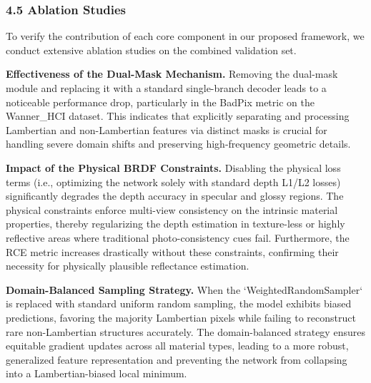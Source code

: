 \subsubsection{4.5 Ablation Studies}

To verify the contribution of each core component in our proposed framework, we conduct extensive ablation studies on the combined validation set. 

\textbf{Effectiveness of the Dual-Mask Mechanism.} 
Removing the dual-mask module and replacing it with a standard single-branch decoder leads to a noticeable performance drop, particularly in the BadPix metric on the Wanner_HCI dataset. This indicates that explicitly separating and processing Lambertian and non-Lambertian features via distinct masks is crucial for handling severe domain shifts and preserving high-frequency geometric details.

\textbf{Impact of the Physical BRDF Constraints.} 
Disabling the physical loss terms (i.e., optimizing the network solely with standard depth L1/L2 losses) significantly degrades the depth accuracy in specular and glossy regions. The physical constraints enforce multi-view consistency on the intrinsic material properties, thereby regularizing the depth estimation in texture-less or highly reflective areas where traditional photo-consistency cues fail. Furthermore, the RCE metric increases drastically without these constraints, confirming their necessity for physically plausible reflectance estimation.

\textbf{Domain-Balanced Sampling Strategy.} 
When the `WeightedRandomSampler` is replaced with standard uniform random sampling, the model exhibits biased predictions, favoring the majority Lambertian pixels while failing to reconstruct rare non-Lambertian structures accurately. The domain-balanced strategy ensures equitable gradient updates across all material types, leading to a more robust, generalized feature representation and preventing the network from collapsing into a Lambertian-biased local minimum.